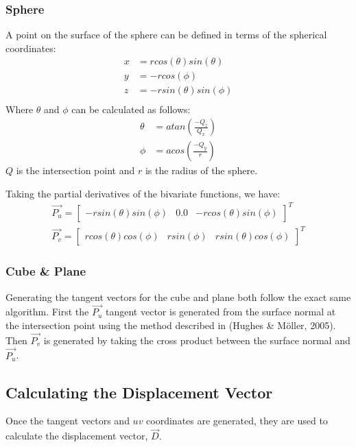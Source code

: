 \subsubsection*{Sphere}
A point on the surface of the sphere can be defined in terms of the spherical
coordinates:
\begin{equation}
\begin{split}
  x &= rcos(\theta)sin(\theta) \\
  y &= -rcos(\phi) \\
  z &= -rsin(\theta)sin(\phi) \\
\end{split}
\end{equation}
Where $\theta$ and $\phi$ can be calculated as follows:
\begin{equation}
\begin{split}
  \theta &= atan(\frac{-Q_{z}}{Q_{x}}) \\
  \phi &= acos(\frac{-Q_{y}}{r})
\end{split}
\end{equation}
$Q$ is the intersection point and $r$ is the radius of the sphere.

Taking the partial derivatives of the bivariate functions, we have:
\begin{equation}
\begin{split}
  \vec{P_{u}} = \begin{bmatrix} -rsin(\theta)sin(\phi) & 0.0 & 
  -rcos(\theta)sin(\phi) \end{bmatrix}^{T} \\
  \vec{P_{v}} = \begin{bmatrix} rcos(\theta)cos(\phi) & rsin(\phi) &
  rsin(\theta)cos(\phi) \end{bmatrix}^{T}
\end{split}
\end{equation}

\subsubsection*{Cube \& Plane}
Generating the tangent vectors for the cube and plane both follow the exact same
algorithm. First the $\vec{P_{u}}$ tangent vector is generated from the surface 
normal at the intersection point using the method described in 
(Hughes \& M{\"o}ller, 2005). Then $\vec{P_{v}}$ is generated by taking the 
cross product between the surface normal and $\vec{P_{u}}$.

\subsection{Calculating the Displacement Vector}
Once the tangent vectors and $uv$ coordinates are generated, they are used to
calculate the displacement vector, $\vec{D}$.

